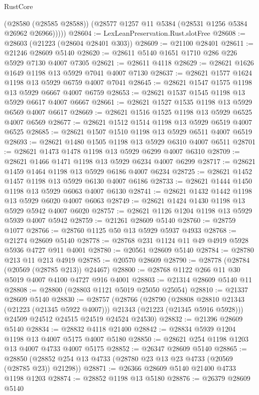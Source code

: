 \begin{lexlean}{RustCore}
\begin{coremodule}
          (@28580 (@28585 @28588))
          (@28577 @1257 @11 @5384 (@28531 @1256 @5384 @26962 @26966)))))
@28604 := LexLeanPreservation.Rust.slotFree
@28608 := @28603 (@21223 (@28604 @28401 @303))
@28609 := @21100 @28401
@28611 := @21246 @28609 @5140
@28620 := @28611 @5140 @1651 @1710 @286 @226 @5929 @7130 @4007 @7305
@28621 := @28611 @4118
@28629 := @28621 @1626 @1649 @1198 @13 @5929 @7041 @4007 @7130
@28637 := @28621 @1577 @1624 @1198 @13 @5929 @6759 @4007 @7041
@28645 := @28621 @1547 @1575 @1198 @13 @5929 @6667 @4007 @6759
@28653 := @28621 @1537 @1545 @1198 @13 @5929 @6617 @4007 @6667
@28661 := @28621 @1527 @1535 @1198 @13 @5929 @6569 @4007 @6617
@28669 := @28621 @1516 @1525 @1198 @13 @5929 @6525 @4007 @6569
@28677 := @28621 @1512 @1514 @1198 @13 @5929 @6519 @4007 @6525
@28685 := @28621 @1507 @1510 @1198 @13 @5929 @6511 @4007 @6519
@28693 := @28621 @1480 @1505 @1198 @13 @5929 @6310 @4007 @6511
@28701 := @28621 @1473 @1478 @1198 @13 @5929 @6299 @4007 @6310
@28709 := @28621 @1466 @1471 @1198 @13 @5929 @6234 @4007 @6299
@28717 := @28621 @1459 @1464 @1198 @13 @5929 @6186 @4007 @6234
@28725 := @28621 @1452 @1457 @1198 @13 @5929 @6130 @4007 @6186
@28733 := @28621 @1444 @1450 @1198 @13 @5929 @6063 @4007 @6130
@28741 := @28621 @1432 @1442 @1198 @13 @5929 @6020 @4007 @6063
@28749 := @28621 @1424 @1430 @1198 @13 @5929 @5942 @4007 @6020
@28757 := @28621 @1126 @1204 @1198 @13 @5929 @5939 @4007 @5942
@28759 := @21261 @28609 @5140
@28760 := @28759 @1077
@28766 := @28760 @1125 @50 @13 @5929 @5937 @4933
@28768 := @21274 @28609 @5140
@28778 := @28768 @231 @1124 @11 @49 @4919 @5928 @5936 @4727 @911 @4001
@28780 := @20561 @28609 @5140
@28784 := @28780 @213 @11 @213 @4919
@28785 := @20570 @28609
@28790 := @28778 (@28784 (@20569 (@28785 @213)) @24467)
@28800 := @28768 @1122 @266 @11 @30 @5019 @4007 @4100 @4727 @916 @4001
@28803 := @21314 @28609 @5140 @11
@28808 := @28800 (@28803 @1121 @5019 @25050 @25054)
@28810 := @21337 @28609 @5140
@28830 := @28757
    (@28766
      (@28790
        (@28808 @28810 @21343 (@21223 (@21345 @5922 @4007)))
        @21343
        (@21223 (@21345 @5916 @5928)))
      @24509
      @24512
      @24515
      @24519
      @24524
      @24530)
@28832 := @21396 @28609 @5140
@28834 := @28832 @4118 @21400
@28842 := @28834 @5939 @1204 @1198 @13 @4007 @5175 @4007 @5180
@28850 := @28621 @254 @1198 @1203 @13 @4007 @4733 @4007 @5175
@28852 := @26347 @28609 @5140
@28865 := @28850 (@28852 @254 @13 @4733 (@28780 @23 @13 @23 @4733 (@20569 (@28785 @23)) @21298))
@28871 := @26366 @28609 @5140 @21400 @4733 @1198 @1203
@28874 := @28852 @1198 @13 @5180
@28876 := @26379 @28609 @5140

\end{coremodule}
\end{lexlean}
